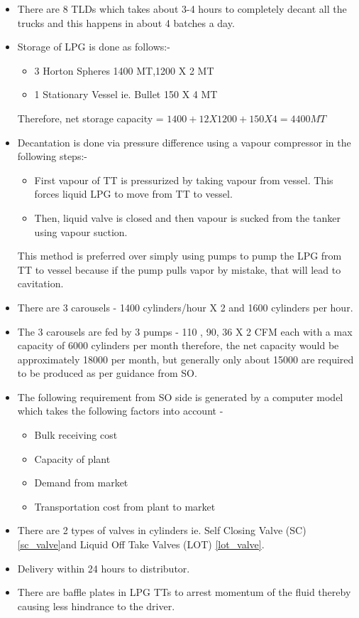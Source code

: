 \documentclass{report}
\begin{document}
\begin{itemize}
		\item There are 8 TLDs which takes about 3-4 hours to completely decant all the trucks and this happens in about 4 batches a day.
		
		\item Storage of LPG is done as follows:-
		\begin{itemize}
			\item 3 Horton Spheres 1400 MT,1200 X 2 MT
			\item 1 Stationary Vessel ie. Bullet 150 X 4 MT
		\end{itemize}
		Therefore, net storage capacity = $1400+12 X 1200+150X4 = 4400 MT$
		\item Decantation is done via pressure difference using a vapour compressor in the following steps:-
		\begin{itemize}
			\item First vapour of TT is pressurized by taking vapour from vessel. This forces liquid LPG to move from TT to vessel.
			\item Then, liquid valve is closed and then vapour is sucked from the tanker using vapour suction.
		\end{itemize}
		This method is preferred over simply using pumps to pump the LPG from TT to vessel because if the pump pulls vapor by mistake, that will lead to cavitation.
		\item There are 3 carousels - 1400 cylinders/hour X 2 and 1600 cylinders per hour.
		\item The 3 carousels are fed by 3 pumps - 110 , 90, 36 X 2 CFM each with a max capacity of 6000 cylinders per month therefore, the net capacity would be approximately 18000 per month, but generally only about 15000 are required to be produced as per guidance from SO.
		\item The following requirement from SO side is generated by a computer model which takes the following factors into account -
		\begin{itemize}
			\item Bulk receiving cost
			\item Capacity of plant
			\item Demand from market
			\item Transportation cost from plant to market
		\end{itemize}
		\item There are 2 types of valves in cylinders ie. Self Closing Valve (SC) \ref{sc_valve}and Liquid Off Take Valves (LOT) \ref{lot_valve}.
		\item Delivery within 24 hours to distributor.
		\item There are baffle plates in LPG TTs to arrest momentum of the fluid thereby causing less hindrance to the driver.
	\end{itemize}
\end{document}
